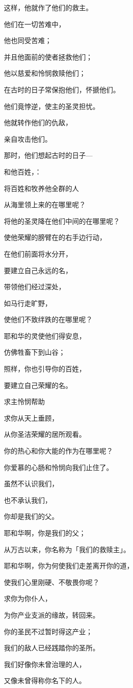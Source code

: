 {\par }{\Q 这样，他就作了他们的救主。
\par }{\Q {}他们在一切苦难中，
\par }{\Q 他也同受苦难；
\par }{\Q 并且他面前的使者拯救他们；
\par }{\Q 他以慈爱和怜悯救赎他们；
\par }{\Q 在古时的日子常保抱他们，怀搋他们。
\par }{\BB \par }{\Q {}他们竟悖逆，使主的圣灵担忧。
\par }{\Q 他就转作他们的仇敌，
\par }{\Q 亲自攻击他们。
\par }{\Q {}那时，他们想起古时的日子—
\par }{和他百姓，{}：
\par }{\Q 将百姓和牧养他全群的人
\par }{\Q 从海里领上来的在哪里呢？
\par }{\Q 将他的圣灵降在他们中间的在哪里呢？
\par }{\Q {}使他荣耀的膀臂在{}的右手边行动，
\par }{\Q 在他们前面将水分开，
\par }{\Q 要建立自己永远的名，
\par }{\Q {}带领他们经过深处，
\par }{\Q 如马行走旷野，
\par }{\Q 使他们不致绊跌的在哪里呢？
\par }{\Q {}耶和华的灵使他们得安息，
\par }{\Q 仿佛牲畜下到山谷；
\par }{\Q 照样，你也引导你的百姓，
\par }{\Q 要建立自己荣耀的名。
\par }{\SH 求主怜悯帮助
\par }{\Q {}求你从天上垂顾，
\par }{\Q 从你圣洁荣耀的居所观看。
\par }{\Q 你的热心和你大能的作为在哪里呢？
\par }{\Q 你爱慕的心肠和怜悯向我们止住了。
\par }{\Q {}虽然不认识我们，
\par }{也不承认我们，
\par }{\Q 你却是我们的父。
\par }{\Q 耶和华啊，你是我们的父；
\par }{\Q 从万古以来，你名称为「我们的救赎主」。
\par }{\Q {}耶和华啊，你为何使我们走差离开你的道，
\par }{\Q 使我们心里刚硬、不敬畏你呢？
\par }{\Q 求你为你仆人，
\par }{\Q 为你产业支派的缘故，转回来。
\par }{\Q {}你的圣民不过暂时得这产业；
\par }{\Q 我们的敌人已经践踏你的圣所。
\par }{\Q {}我们好像你未曾治理的人，
\par }{\Q 又像未曾得称你名下的人。

}
